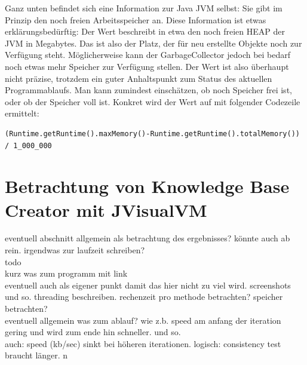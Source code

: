 \documentclass[12pt,a4paper]{article}
\begin{document}
Ganz unten befindet sich eine Information zur Java JVM selbst: Sie gibt im Prinzip den noch freien Arbeitsspeicher an. Diese Information ist etwas erklärungsbedürftig: Der Wert beschreibt in etwa den noch freien HEAP der JVM in Megabytes. Das ist also der Platz, der für neu erstellte Objekte noch zur Verfügung steht. Möglicherweise kann der GarbageCollector jedoch bei bedarf noch etwas mehr Speicher zur Verfügung stellen. Der Wert ist also überhaupt nicht präzise, trotzdem ein guter Anhaltspunkt zum Status des aktuellen Programmablaufs. Man kann zumindest einschätzen, ob noch Speicher frei ist, oder ob der Speicher voll ist. Konkret wird der Wert auf mit folgender Codezeile ermittelt:


\begin{lstlisting}
(Runtime.getRuntime().maxMemory()-Runtime.getRuntime().totalMemory()) / 1_000_000
\end{lstlisting}


\section{Betrachtung von Knowledge Base Creator mit JVisualVM}
eventuell abschnitt allgemein als betrachtung des ergebnisses? könnte auch ab rein.
irgendwas zur laufzeit schreiben? \\
todo \\
kurz was zum programm mit link \\
eventuell auch als eigener punkt damit das hier nicht zu viel wird. screenshots und so. threading beschreiben. rechenzeit pro methode betrachten? speicher betrachten? \\
eventuell allgemein was zum ablauf? wie z.b. speed am anfang der iteration gering und wird zum ende hin schneller. und so. \\
auch: speed (kb/sec) sinkt bei höheren iterationen. logisch: consistency test braucht länger.
n
\end{document}
